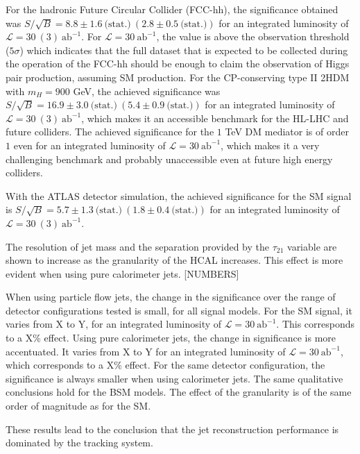 For the hadronic Future Circular Collider (FCC-hh), the significance obtained was $S/\sqrt{B}= 8.8\pm 1.6~\text{(stat.)}~(2.8\pm0.5~\text{(stat.)})$ for an integrated luminosity of $\mathcal{L}=30~(3)~\text{ab}^{-1}$. For $\mathcal{L}=30~\text{ab}^{-1}$, the value is above the observation threshold ($5\sigma$) which indicates that the full dataset that is expected to be collected during the operation of the FCC-hh should be enough to claim the observation of Higgs pair production, assuming SM production. For the CP-conserving type II 2HDM with $m_H=900$ GeV, the achieved significance was $S/\sqrt{B}=16.9\pm 3.0~\text{(stat.)} ~(5.4\pm0.9~\text{(stat.)})$ for an integrated luminosity of $\mathcal{L}=30~(3)~\text{ab}^{-1}$, which makes it an accessible benchmark for the HL-LHC and future colliders. The achieved significance for the $1$ TeV DM mediator is of order $1$ even for an integrated luminosity of $\mathcal{L}=30~\text{ab}^{-1}$, which makes it a very challenging benchmark and probably unaccessible even at future high energy colliders. 

With the ATLAS detector simulation, the achieved significance for the SM signal is $S/\sqrt{B}=5.7\pm 1.3~\text{(stat.)} ~(1.8\pm 0.4~\text{(stat.)})$ for an integrated luminosity of $\mathcal{L}=30~(3)~\text{ab}^{-1}$. 

The resolution of jet mass and the separation provided by the $\tau_{21}$ variable are shown to increase as the granularity of the HCAL increases. This effect is more evident when using pure calorimeter jets. [NUMBERS]

When using particle flow jets, the change in the significance over the range of detector configurations tested is small, for all signal models. For the SM signal, it varies from X to Y, for an integrated luminosity of $\mathcal{L}=30~\text{ab}^{-1}$. This corresponds to a X\% effect. Using pure calorimeter jets, the change in significance is more accentuated. It varies from X to Y for an integrated luminosity of $\mathcal{L}=30~\text{ab}^{-1}$, which corresponds to a X\% effect. For the same detector configuration, the significance is always smaller when using calorimeter jets. The same qualitative conclusions hold for the BSM models. The effect of the granularity is of the same order of magnitude as for the SM.

These results lead to the conclusion that the jet reconstruction performance is dominated by the tracking system. 

